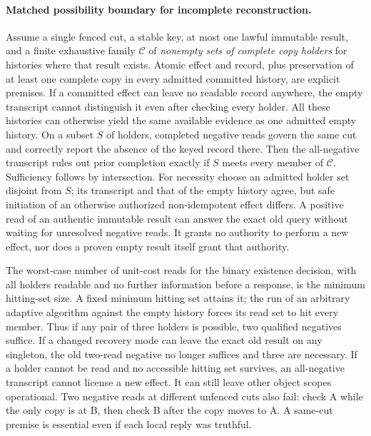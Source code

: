 \documentclass{article}
\begin{document}
\paragraph{Matched possibility boundary for incomplete reconstruction.}
Assume a single fenced cut, a stable key, at most one lawful immutable
result, and a finite exhaustive family $\mathcal C$ of \emph{nonempty
sets of complete copy holders} for histories where that result exists.
Atomic effect and record, plus preservation of at least one complete
copy in every admitted committed history, are explicit premises. If a
committed effect can leave no readable record anywhere, the empty
transcript cannot distinguish it even after checking every holder.
All these histories can otherwise yield the same available evidence
as one admitted empty history. On a subset $S$ of holders, completed
negative reads govern the same cut and correctly report the absence of
the keyed record there. Then the all-negative transcript rules out
prior completion exactly if $S$ meets every member of $\mathcal C$.
Sufficiency follows by intersection. For necessity choose an
admitted holder set disjoint from $S$; its transcript and that of
the empty history agree, but safe initiation of an otherwise
authorized non-idempotent effect differs. A positive read of an
authentic immutable result can answer the exact old query without
waiting for unresolved negative reads. It grants no authority to
perform a new effect, nor does a proven empty result itself grant
that authority.

The worst-case number of unit-cost reads for the binary existence
decision, with all holders readable and no further information
before a response, is the minimum hitting-set size. A fixed
minimum hitting set attains it; the run of an arbitrary adaptive
algorithm against the empty history forces its read set to hit
every member. Thus if any pair of three holders is possible, two
qualified negatives suffice. If a changed recovery mode can leave
the exact old result on any singleton, the old two-read negative
no longer suffices and three are necessary. If a holder cannot be
read and no accessible hitting set survives, an all-negative
transcript cannot license a new effect. It can still leave other
object scopes operational. Two negative reads at different
unfenced cuts also fail: check A while the only copy is at B,
then check B after the copy moves to A. A same-cut premise is
essential even if each local reply was truthful.
\end{document}
